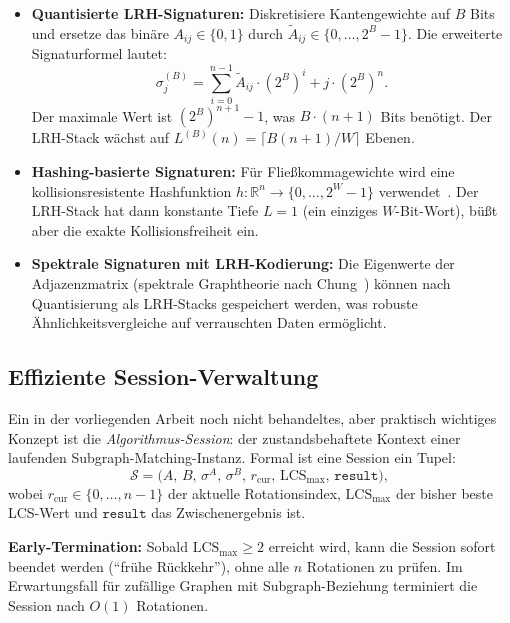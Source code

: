 ﻿\documentclass[a4paper,12pt]{article}
\theoremstyle{definition}
\begin{document}
\begin{itemize}
  \item \textbf{Quantisierte LRH-Signaturen:} Diskretisiere Kantengewichte auf
        $B$ Bits und ersetze das binäre $A_{ij} \in \{0,1\}$ durch
        $\tilde{A}_{ij} \in \{0,\ldots,2^B-1\}$. Die erweiterte Signaturformel lautet:
        \[
          \sigma_j^{(B)} = \sum_{i=0}^{n-1} \tilde{A}_{ij} \cdot (2^B)^i + j \cdot (2^B)^n.
        \]
        Der maximale Wert ist $(2^B)^{n+1} - 1$, was $B \cdot (n+1)$ Bits benötigt.
        Der LRH-Stack wächst auf $L^{(B)}(n) = \lceil B(n+1)/W \rceil$ Ebenen.

  \item \textbf{Hashing-basierte Signaturen:} Für Fließkommagewichte wird eine
        kollisionsresistente Hashfunktion $h: \mathbb{R}^n \to \{0,\ldots,2^W-1\}$
        verwendet~\cite{indyk1998}. Der LRH-Stack hat dann konstante Tiefe $L=1$
        (ein einziges $W$-Bit-Wort), büßt aber die exakte Kollisionsfreiheit ein.

  \item \textbf{Spektrale Signaturen mit LRH-Kodierung:} Die Eigenwerte der
        Adjazenzmatrix (spektrale Graphtheorie nach Chung~\cite{chung1997}) können
        nach Quantisierung als LRH-Stacks gespeichert werden, was robuste
        Ähnlichkeitsvergleiche auf verrauschten Daten ermöglicht.
\end{itemize}

\subsection{Effiziente Session-Verwaltung}

Ein in der vorliegenden Arbeit noch nicht behandeltes, aber praktisch wichtiges Konzept
ist die \emph{Algorithmus-Session}: der zustandsbehaftete Kontext einer laufenden
Subgraph-Matching-Instanz. Formal ist eine Session ein Tupel:
\[
  \mathcal{S} = \bigl(A,\, B,\, \sigma^A,\, \sigma^B,\, r_{\mathrm{cur}},\,
                \mathrm{LCS}_{\max},\, \mathtt{result}\bigr),
\]
wobei $r_{\mathrm{cur}} \in \{0,\ldots,n-1\}$ der aktuelle Rotationsindex,
$\mathrm{LCS}_{\max}$ der bisher beste LCS-Wert und $\mathtt{result}$ das
Zwischen\-er\-gebnis ist.

\textbf{Early-Termination:} Sobald $\mathrm{LCS}_{\max} \geq 2$ erreicht wird,
kann die Session sofort beendet werden (``frühe Rückkehr''), ohne alle $n$ Rotationen
zu prüfen. Im Erwartungsfall für zufällige Graphen mit Subgraph-Beziehung terminiert
die Session nach $O(1)$ Rotationen.
\end{document}
